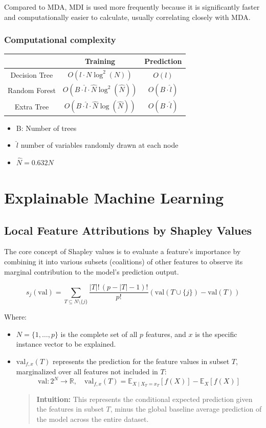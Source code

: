 \documentclass{article}
\begin{document}
Compared to MDA, MDI is used more frequently because it is significantly faster and computationally easier to calculate, usually correlating closely with MDA.

\subsubsection{Computational complexity}
\begin{center}
  \begin{tabular}{|c|c|c|}
    \hline
     & Training & Prediction \\
     \hline
     Decision Tree & $O(l \cdot N \log^2(N))$ & $O(l)$\\
     \hline
     Random Forest & $O(B \cdot \hat{l} \cdot \hat{N} \log^2(\hat{N}))$ & $O(B \cdot \hat{l})$\\
     \hline
     Extra Tree & $O(B \cdot \hat{l} \cdot \hat{N} \log(\hat{N}))$ &$O(B \cdot \hat{l})$\\
    \hline
  \end{tabular}
  \begin{itemize}
    \item B: Number of trees
    \item $\hat{l}$ number of variables randomly drawn at each node
    \item $\hat{N} = 0.632N$
  \end{itemize}
\end{center}

\section{Explainable Machine Learning}
\subsection{Local Feature Attributions by Shapley Values}
The core concept of Shapley values is to evaluate a feature's importance by combining it into various subsets (coalitions) of other features to observe its marginal contribution to the model's prediction output.

\[ s_j(\text{val}) = \sum_{T\subseteq N \setminus \{j\}} \frac{|T|! \, (p-|T|-1)!}{p!}\left(\text{val}(T\cup \{j\}) - \text{val}(T)\right) \]

Where:
\begin{itemize}
  \item $N = \{1,\dots,p\}$ is the complete set of all $p$ features, and $x$ is the specific instance vector to be explained.
  \item $\text{val}_{f,x}(T)$ represents the prediction for the feature values in subset $T$, marginalized over all features not included in $T$:
  \[ \text{val}: 2^N \to \mathbb{R}, \quad \text{val}_{f,x}(T) = \mathbb{E}_{X \mid X_T = x_T}[f(X)] - \mathbb{E}_X[f(X)] \]
  \begin{quote}
    \textbf{Intuition:} This represents the conditional expected prediction given the features in subset $T$, minus the global baseline average prediction of the model across the entire dataset.
  \end{quote}
\end{itemize}
\end{document}
